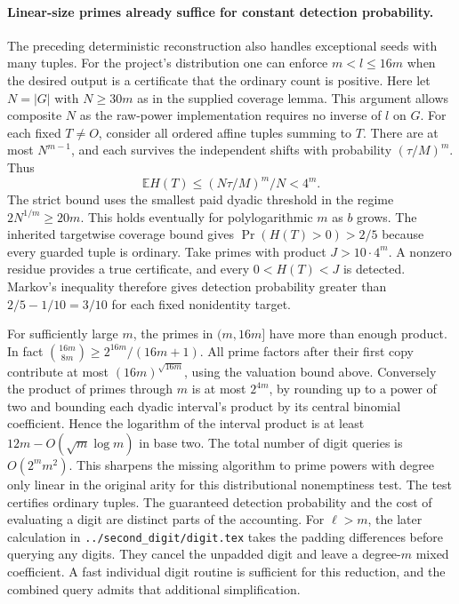 \documentclass[11pt]{article}
\begin{document}
\paragraph{Linear-size primes already suffice for constant detection probability.}
The preceding deterministic reconstruction also handles exceptional
seeds with many tuples. For the project's distribution one can
enforce $m<l\le16m$ when the desired output is a certificate that
the ordinary count is positive. Here let $N=|G|$ with $N\ge30m$ as in
the supplied coverage lemma. This argument allows composite $N$ as
the raw-power implementation requires no inverse of $l$ on $G$.
For each fixed $T\ne O$, consider
all ordered affine tuples summing to $T$. There are at most
$N^{m-1}$, and each survives the independent shifts with probability
$(\tau/M)^m$. Thus
\[
  \mathbb E H(T)\le (N\tau/M)^m/N < 4^m .
\]
The strict bound uses the smallest paid dyadic threshold in the
regime $2N^{1/m}\ge20m$. This holds eventually for polylogarithmic
$m$ as $b$ grows. The inherited targetwise coverage bound gives
$\Pr(H(T)>0)>2/5$ because every guarded tuple is ordinary.
Take primes with product $J>10\cdot4^m$. A nonzero residue provides
a true certificate, and every $0<H(T)<J$ is detected. Markov's
inequality therefore gives detection probability greater than
$2/5-1/10=3/10$ for each fixed nonidentity target.

For sufficiently large $m$, the primes in $(m,16m]$ have more
than enough product. In fact $\binom{16m}{8m}\ge 2^{16m}/(16m+1)$.
All prime factors after their first copy contribute at most
$(16m)^{\sqrt{16m}}$, using the valuation bound above. Conversely
the product of primes through $m$ is at most $2^{4m}$, by rounding
up to a power of two and bounding each dyadic interval's product
by its central binomial coefficient. Hence the logarithm of the
interval product is at least $12m-O(\sqrt m\log m)$ in base two.
The total number of digit queries is $O(2^m m^2)$. This sharpens the
missing algorithm to prime powers with degree only linear in the
original arity for this distributional nonemptiness test. The test
certifies ordinary tuples. The guaranteed detection probability and
the cost of evaluating a digit are distinct parts of the accounting.
For $\ell>m$, the later calculation in
\texttt{../second\_digit/digit.tex} takes the padding differences
before querying any digits. They cancel the unpadded digit and leave
a degree-$m$ mixed coefficient. A fast individual digit routine is
sufficient for this reduction, and the combined query admits that
additional simplification.
\end{document}
